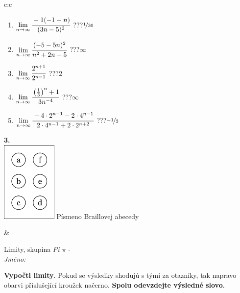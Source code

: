\documentclass[10pt]{report}
\begin{document}
\begin{tabular}{c:c}
\begin{minipage}[c][104.5mm][t]{0.5\linewidth}
\begin{center}
\begin{minipage}{0.79\linewidth}
\begin{center}
\begin{varwidth}{\linewidth}
\begin{enumerate}
\item $\lim\limits_{n\to\infty}\cfrac{-1(-1-n)}{(3n-5)^2}$\quad \dotfill\; ???\;\dotfill \quad $\nicefrac{1}{30}$
\item $\lim\limits_{n\to\infty}\cfrac{(-5-5n)^2}{n^2+2n-5}$\quad \dotfill\; ???\;\dotfill \quad $\infty$
\item $\lim\limits_{n\to\infty}\cfrac{2^{n+1}}{2^{n-1}}$\quad \dotfill\; ???\;\dotfill \quad $2$
\item $\lim\limits_{n\to\infty}\cfrac{\left(\frac{1}{3}\right)^n +1}{3n^{-4}}$\quad \dotfill\; ???\;\dotfill \quad $\infty$
\item $\lim\limits_{n\to\infty}\cfrac{-4\cdot 2^{n-1}-2\cdot 4^{n-1}}{2\cdot 4^{n-1}+2\cdot 2^{n+2}}$\quad \dotfill\; ???\;\dotfill \quad $\nicefrac{-1}{2}$
\end{enumerate}
\end{varwidth}
\end{center}
\end{minipage}
\begin{minipage}{0.20\linewidth}
\begin{center}
{\Huge\bfseries 3.} \\[2mm]
\includegraphics[height=40mm]{../images/braille.png}
{\small Písmeno Braillovej abecedy}
\end{center}
\end{minipage}
\end{center}
\end{minipage}
&
\begin{minipage}[c][104.5mm][t]{0.5\linewidth}
\begin{center}
\vspace{7mm}
{\huge Limity, skupina \textit{Pi $\pi$} -}\\[5mm]
\textit{Jméno:}\phantom{xxxxxxxxxxxxxxxxxxxxxxxxxxxxxxxxxxxxxxxxxxxxxxxxxxxxxxxxxxxxxxxxx}\\[5mm]
\begin{minipage}{0.95\linewidth}
\begin{center}
\textbf{Vypočti limity}. Pokud se výsledky shodujú s tými za otazníky, tak napravo\\obarvi příslušející kroužek načerno. \textbf{Spolu odevzdejte výsledné slovo}.

\end{center}
\end{minipage}
\end{center}
\end{minipage}
\end{tabular}
\end{document}
